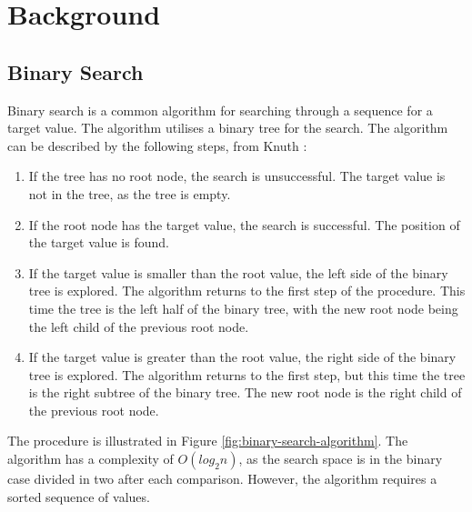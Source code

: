 \chapter{Background}
\label{cha:background}

\section{Binary Search}
Binary search is a common algorithm for searching through a sequence for a target value.
The algorithm utilises a binary tree for the search.
The algorithm can be described by the following steps, from Knuth \cite{Knuth1971}:
\begin{enumerate}
    \item If the tree has no root node, the search is unsuccessful. 
    The target value is not in the tree, as the tree is empty.
    \item If the root node has the target value, the search is successful.
    The position of the target value is found.
    \item If the target value is smaller than the root value, the left side of the binary tree is explored.
    The algorithm returns to the first step of the procedure.
    This time the tree is the left half of the binary tree, with the new root node being the left child of the previous root node.
    \item If the target value is greater than the root value, the right side of the binary tree is explored.
    The algorithm returns to the first step, but this time the tree is the right subtree of the binary tree.
    The new root node is the right child of the previous root node.
\end{enumerate}
The procedure is illustrated in Figure \ref{fig:binary-search-algorithm}.
The algorithm has a complexity of $O(log_2 n)$, as the search space is in the binary case divided in two after each comparison.
However, the algorithm requires a sorted sequence of values.

